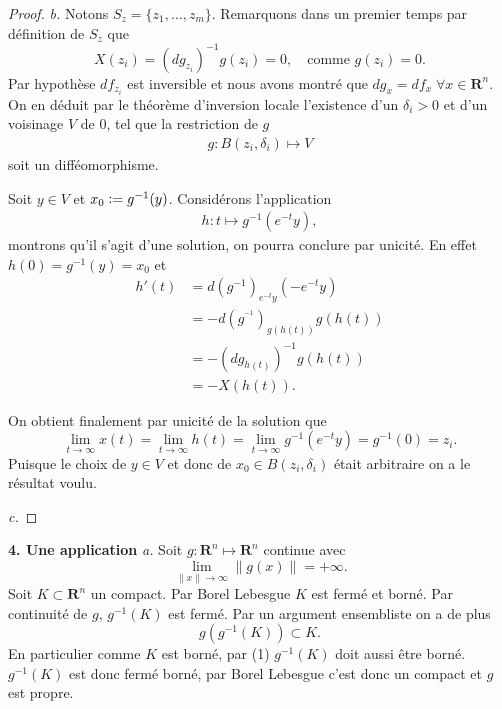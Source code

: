 \documentclass[12pt]{article}
\newcommand{\defeq}{\vcentcolon=}
\newcommand{\R}{\mathbf{R}}
\begin{document}
\begin{proof}
\medskip

\textit{b.} Notons $S_{z} = \{z_1, \ldots, z_{m}\}$. Remarquons dans un premier temps par définition de $S_{z}$ que \[
        X(z_{i}) = (dg_{z_{i}})^{-1}g(z_{i}) = 0, \quad \text{comme } g(z_{i}) = 0
.\] Par hypothèse $df_{z_{i}}$ est inversible et nous avons montré que $dg_{x} = df_{x} \; \forall x \in \R^{n}$. On en déduit par le théorème d'inversion locale l'existence d'un $\delta_{i} > 0$ et d'un voisinage $V$ de 0, tel que la restriction de $g$
\begin{align*}
        g : B(z_{i}, \delta_{i}) \longmapsto V
\end{align*} soit un difféomorphisme.

Soit $y \in V$ et $x_0 \defeq g^{-1}(y)$. Considérons l'application
\begin{align*}
        h : t \longmapsto g^{-1}(e^{-t}y)
,\end{align*} montrons qu'il s'agit d'une solution, on pourra conclure par unicité.
En effet $h(0) = g^{-1}(y) = x_0$ et
\begin{align*}
        h'(t) &= d(g^{-1})_{e^{-t}y}(-e^{-t}y) \\
              &= -d(g^{^{-1}})_{g(h(t))}g(h(t)) \\
              &= -(dg_{h(t)})^{-1}g(h(t)) \\
              &= -X(h(t))
.\end{align*}

On obtient finalement par unicité de la solution que \[
        \lim_{t\to \infty}x(t) = \lim_{t\to \infty}h(t) = \lim_{t\to \infty}g^{-1}(e^{-t}y) = g^{-1}(0) = z_{i}
.\] Puisque le choix de $y \in V$ et donc de $x_0 \in B(z_{i}, \delta_{i})$ était arbitraire on a le résultat voulu. 

\medskip

\textit{c.} 
\end{proof}

\bigskip

\textbf{4. Une application} \textit{a.} Soit $g : \R^{n} \longmapsto \R^{n}$ continue avec  
\begin{equation}
        \lim_{\|x\|\to \infty}\|g(x)\| = +\infty.
\end{equation}
Soit $K \subset \R^{n}$ un compact. Par Borel Lebesgue $K$ est fermé et borné. Par continuité de $g$, $g^{-1}(K)$ est fermé. Par un argument ensembliste on a de plus \[
g(g^{-1}(K)) \subset K
.\] En particulier comme $K$ est borné, par (1) $g^{-1}(K)$ doit aussi être borné. $g^{-1}(K)$ est donc fermé borné, par Borel Lebesgue c'est donc un compact et $g$ est propre. 
\end{document}
